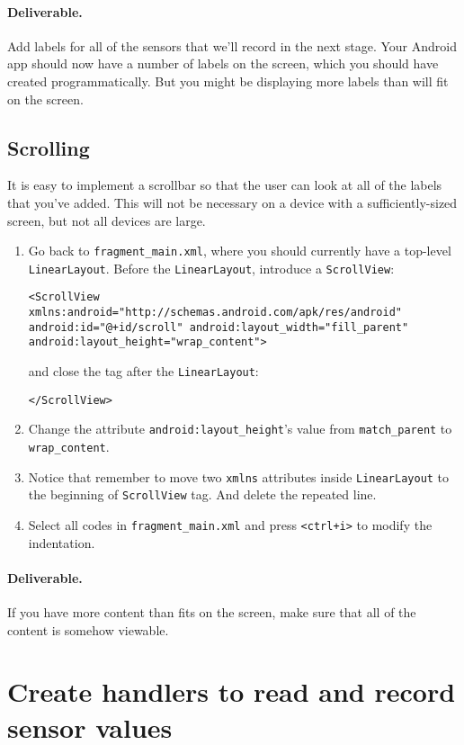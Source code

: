 \documentclass[10pt]{article}
\begin{document}
\paragraph{Deliverable.} Add labels for all of the sensors that we'll record in the next stage. Your Android app should now have a number of labels on the screen, which you should have created programmatically. But you might be displaying more labels than will fit on the screen.
\subsection{Scrolling}
It is easy to implement a scrollbar so that the user can look at all of the labels that you've added. This will not be necessary on a device with a sufficiently-sized screen, but not all devices are large.
\begin{enumerate}
\item Go back to {\tt fragment\_main.xml}, where you should currently have a top-level {\tt LinearLayout}. Before the {\tt LinearLayout}, introduce a {\tt ScrollView}:
\begin{lstlisting}
<ScrollView xmlns:android="http://schemas.android.com/apk/res/android"
android:id="@+id/scroll" android:layout_width="fill_parent"
android:layout_height="wrap_content">
\end{lstlisting}
and close the tag after the {\tt LinearLayout}:
\begin{lstlisting}
</ScrollView>
\end{lstlisting}
\item Change the attribute \verb+android:layout_height+'s value from \verb+match_parent+ to \verb+wrap_content+.
\item Notice that remember to move two \texttt{xmlns} attributes inside \texttt{LinearLayout} to the beginning of \texttt{ScrollView} tag. And delete the repeated line. 
\item Select all codes in \verb+fragment_main.xml+ and press \texttt{<ctrl+i>} to modify the indentation. 
\end{enumerate}
\paragraph{Deliverable.} If you have more content than fits on the screen, make sure that all of the content is somehow viewable.
\section{Create handlers to read and record sensor values}
\end{document}
